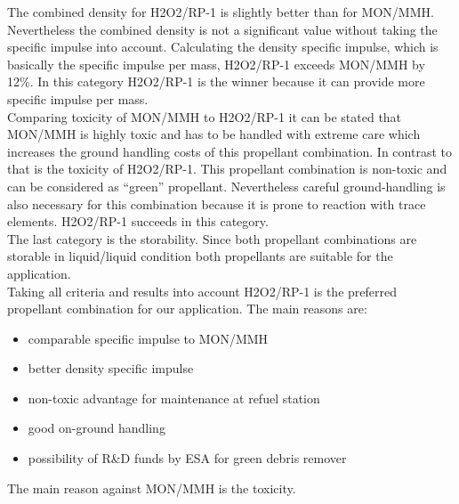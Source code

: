 The combined density for H2O2/RP-1 is slightly better than for MON/MMH. Nevertheless the combined density is not a significant value without taking the specific impulse into account. Calculating the density specific impulse, which is basically the specific impulse per mass, H2O2/RP-1 exceeds MON/MMH by 12\%. In this category H2O2/RP-1 is the winner because it can provide more specific impulse per mass.\\

Comparing toxicity of MON/MMH to H2O2/RP-1 it can be stated that MON/MMH is highly toxic and has to be handled with extreme care which increases the ground handling costs of this propellant combination. In contrast to that is the toxicity of H2O2/RP-1. This propellant combination is non-toxic and can be considered as “green” propellant. Nevertheless careful ground-handling is also necessary for this combination because it is prone to reaction with trace elements. H2O2/RP-1 succeeds in this category.\\

The last category is the storability. Since both propellant combinations are storable in liquid/liquid condition both propellants are suitable for the application.\\

Taking all criteria and results into account H2O2/RP-1 is the preferred propellant combination for our application. The main reasons are:
\begin{itemize}
	\item	comparable specific impulse to MON/MMH
	\item	better density specific impulse
	\item	non-toxic advantage for maintenance at refuel station
	\item	good on-ground handling
	\item	possibility of R\&D funds by ESA for green debris remover	
\end{itemize}

The main reason against MON/MMH is the toxicity.

